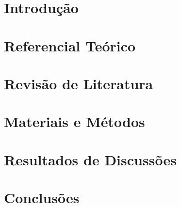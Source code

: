 \documentclass[english,brazil]{iftex}
\begin{document}
\maketitle

\chapter{Introdução} \label{cap:introducao}



\chapter{Referencial Teórico}



\chapter{Revisão de Literatura}



\chapter{Materiais e Métodos}



\chapter{Resultados de Discussões} \label{capitulo:ferramentas_uteis}



\chapter{Conclusões}



\postextual
\end{document}
